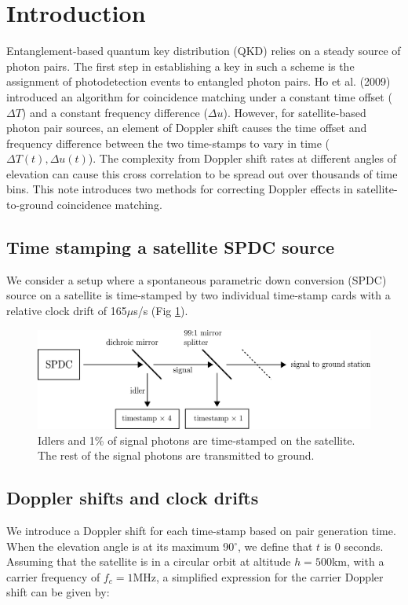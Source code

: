 \section{Introduction}
Entanglement-based quantum key distribution (QKD) relies on a steady source of photon pairs. The first step in establishing a key in such a scheme is the assignment of photodetection events to entangled photon pairs. Ho et al. (2009) \cite{ho2009clock} introduced an algorithm for coincidence matching under a constant time offset ($\Delta T$) and a constant frequency difference ($\Delta u$). However, for satellite-based photon pair sources, an element of Doppler shift causes the time offset and frequency difference between the two time-stamps to vary in time ($\Delta T(t),\Delta u(t)$). The complexity from Doppler shift rates at different angles of elevation can cause this cross correlation to be spread out over thousands of time bins. This note introduces two methods for correcting Doppler effects in satellite-to-ground coincidence matching. 

\subsection{Time stamping a satellite SPDC source}

We consider a setup where a spontaneous parametric down conversion (SPDC) source on a satellite is time-stamped by two individual time-stamp cards with a relative clock drift of 165$\mu$s/s (Fig \ref{fig:spdc_source}).\\ 

\begin{figure}[ht!]
	\includegraphics[width=\linewidth]{assets/spdc_source}
	\caption{Idlers and 1\% of signal photons are time-stamped on the satellite. The rest of the signal photons are transmitted to ground.}
	\label{fig:spdc_source}
\end{figure}

\newpage

\subsection{Doppler shifts and clock drifts}
We introduce a Doppler shift for each time-stamp based on pair generation time. When the elevation angle is at its maximum 90$^\circ$, we define that $t$ is 0 seconds. Assuming that the satellite is in a circular orbit at altitude $h = 500$km, with a carrier frequency of $f_c = 1$MHz, a simplified expression for the carrier Doppler shift can be given by:

